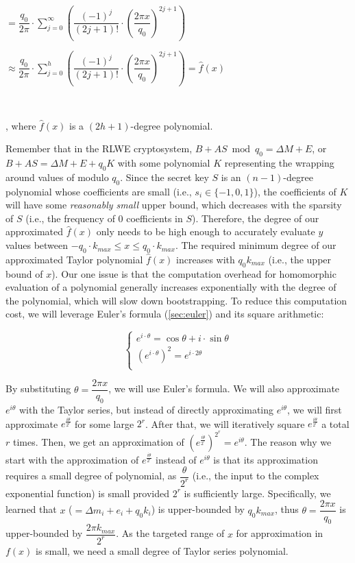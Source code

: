 $ = \dfrac{q_0}{2\pi}\cdot \sum\limits_{j=0}^{\infty}\left(\dfrac{(-1)^j}{(2j + 1)!}\cdot \left(\dfrac{2\pi x}{q_0}\right)^{2j + 1}\right)$

$ \approx \dfrac{q_0}{2\pi}\cdot \sum\limits_{j=0}^{h}\left(\dfrac{(-1)^j}{(2j + 1)!}\cdot \left(\dfrac{2\pi x}{q_0}\right)^{2j + 1}\right) = \hat f(x)$

$ $

, where $\hat{f}(x)$ is a $(2h + 1)$-degree polynomial. 

Remember that in the RLWE cryptosystem, $B + AS \bmod q_0 = \Delta M + E$, or $B + AS = \Delta M + E + q_0K$ with some polynomial $K$ representing the wrapping around values of modulo $q_0$. Since the secret key $S$ is an $(n-1)$-degree polynomial whose coefficients are small (i.e., $s_i \in \{-1, 0, 1\}$), the coefficients of $K$ will have some \textit{reasonably small} upper bound, which decreases with the sparsity of $S$ (i.e., the frequency of 0 coefficients in $S$). Therefore, the degree of our approximated $\hat f(x)$ only needs to be high enough to accurately evaluate $y$ values between $-q_0\cdot \mathit{k_{max}} \leq x \leq q_0\cdot \mathit{k_{max}}$.
The required minimum degree of our approximated Taylor polynomial $\hat f(x)$ increases with $q_0\mathit{k_{max}}$ (i.e., the upper bound of $x$). Our one issue is that the computation overhead for homomorphic evaluation of a polynomial generally increases exponentially with the degree of the polynomial, which will slow down bootstrapping. To reduce this computation cost, we will leverage Euler's formula (\autoref{sec:euler}) and its square arithmetic:

\[
\begin{cases}
e^{i\cdot \theta} = \cos \theta + i \cdot \sin \theta\\
(e^{i \cdot \theta})^2 = e^{i\cdot 2\theta}\\
\end{cases}
\]

By substituting $\theta = \dfrac{2\pi x}{q_0}$, we will use Euler's formula. We will also approximate $e^{i\theta}$ with the Taylor series, but instead of directly approximating $e^{i\theta}$, we will first approximate $e^{\frac{i\theta}{2^r}}$ for some large $2^r$. After that, we will iteratively square $e^{\frac{i\theta}{2^r}}$ a total $r$ times. Then, we get an approximation of $(e^{\frac{i\theta}{2^r}})^{2^r} = e^{i\theta}$. The reason why we start with the approximation of $e^{\frac{i\theta}{2^r}}$ instead of $e^{i\theta}$ is that its approximation requires a small degree of polynomial, as $\dfrac{\theta}{2^r}$ (i.e., the input to the complex exponential function) is small provided $2^r$ is sufficiently large. Specifically, we learned that $x$ ($= \Delta m_i + e_i + q_0k_i$) is upper-bounded by $q_0\mathit{k_{max}}$, thus $\theta = \dfrac{2\pi x}{q_0}$ is upper-bounded by $\dfrac{2\pi\mathit{k_{max}}}{2^r}$. As the targeted range of $x$ for approximation in $f(x)$ is small, we need a small degree of Taylor series polynomial. 

